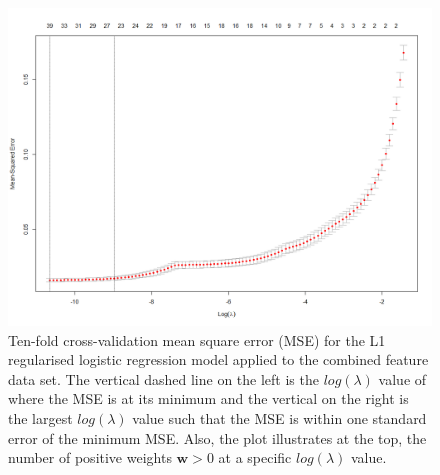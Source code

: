 \begin{figure}[]
	\begin{center}
		\includegraphics[scale=0.45]{fig/CH3/cv_lambda_all.png}
		\caption{Ten-fold cross-validation mean square error (MSE) for the L1 regularised logistic regression model applied to the combined feature data set. The vertical dashed line on the left is the $log(\lambda)$ value of where the MSE is at its minimum and the vertical on the right is the largest $log(\lambda)$ value such that the MSE is within one standard error of the minimum MSE. Also, the plot illustrates at the top, the number of positive weights $\boldsymbol{w} > 0$ at a specific $log(\lambda)$ value.}
		\label{fig:ch3_lr_lambda_cv_all}
	\end{center}	
\end{figure}

